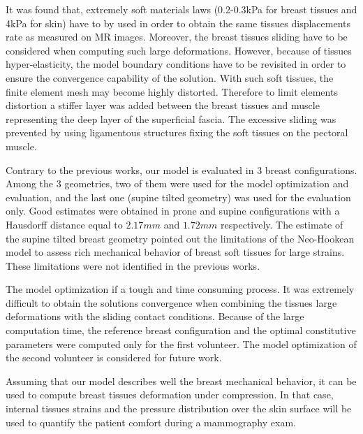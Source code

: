 It was found that, extremely soft materials laws (0.2-0.3kPa for breast tissues and 4kPa for skin) have to by used in order to obtain the same tissues displacements rate as measured on MR images. Moreover, the breast tissues sliding have to be considered when computing such large deformations. However, because of tissues hyper-elasticity, the model boundary conditions have to be revisited in order to ensure the convergence capability of the solution. With such soft tissues, the finite element mesh may become highly distorted. Therefore to limit elements distortion a stiffer layer was added between the breast tissues and muscle representing the deep layer of the superficial fascia. The excessive  sliding was prevented by using ligamentous structures fixing the soft tissues on the pectoral muscle.

Contrary to the previous works, our model is evaluated in 3 breast configurations. Among the 3 geometries, two of them were used for the model optimization and evaluation, and the last one (supine tilted geometry) was used for the evaluation only. Good estimates were obtained in prone and supine configurations with a Hausdorff distance equal to $2.17 mm$ and $1.72 mm$ respectively.  The estimate of the supine tilted breast geometry pointed out the limitations of the Neo-Hookean model to assess rich mechanical behavior of breast soft tissues for large strains. These limitations were not identified in the previous works. 

The model optimization if a tough and time consuming process. It was extremely difficult to obtain the solutions convergence when combining the tissues large deformations with the sliding contact conditions. Because of the large computation time, the reference breast configuration and the optimal constitutive parameters were computed only for the first volunteer. The model optimization of the second volunteer is considered for future work.

Assuming that our model describes well the breast mechanical behavior, it can be used to compute breast tissues deformation under compression. In that case, internal tissues strains and the pressure distribution over the skin surface will be used to quantify the patient comfort during a mammography exam. 
   
